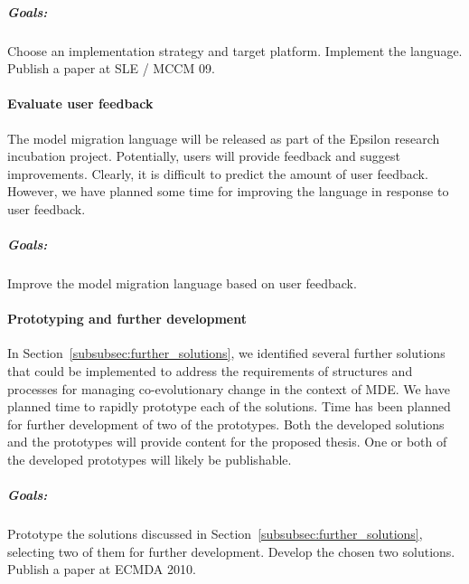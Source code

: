 \subparagraph{Goals:} Choose an implementation strategy and target platform. Implement the language. Publish a paper at SLE / MCCM 09.


\paragraph{Evaluate user feedback}
The model migration language will be released as part of the Epsilon research incubation project. Potentially, users will provide feedback and suggest improvements. Clearly, it is difficult to predict the amount of user feedback. However, we have planned some time for improving the language in response to user feedback.

\subparagraph{Goals:} Improve the model migration language based on user feedback.


\paragraph{Prototyping and further development}
In Section~\ref{subsubsec:further_solutions}, we identified several further solutions that could be implemented to address the requirements of structures and processes for managing co-evolutionary change in the context of MDE. We have planned time to rapidly prototype each of the solutions. Time has been planned for further development of two of the prototypes. Both the developed solutions and the prototypes will provide content for the proposed thesis. One or both of the developed prototypes will likely be publishable.

\subparagraph{Goals:} Prototype the solutions discussed in Section~\ref{subsubsec:further_solutions}, selecting two of them for further development. Develop the chosen two solutions. Publish a paper at ECMDA 2010.